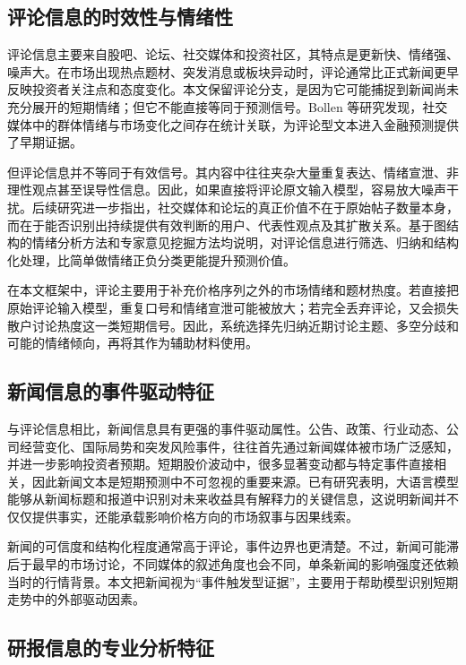 \subsection{评论信息的时效性与情绪性}

评论信息主要来自股吧、论坛、社交媒体和投资社区，其特点是更新快、情绪强、噪声大。在市场出现热点题材、突发消息或板块异动时，评论通常比正式新闻更早反映投资者关注点和态度变化。本文保留评论分支，是因为它可能捕捉到新闻尚未充分展开的短期情绪；但它不能直接等同于预测信号。Bollen 等研究发现，社交媒体中的群体情绪与市场变化之间存在统计关联，为评论型文本进入金融预测提供了早期证据\cite{bollen2011twitter}。

但评论信息并不等同于有效信号。其内容中往往夹杂大量重复表达、情绪宣泄、非理性观点甚至误导性信息。因此，如果直接将评论原文输入模型，容易放大噪声干扰。后续研究进一步指出，社交媒体和论坛的真正价值不在于原始帖子数量本身，而在于能否识别出持续提供有效判断的用户、代表性观点及其扩散关系。基于图结构的情绪分析方法和专家意见挖掘方法均说明，对评论信息进行筛选、归纳和结构化处理，比简单做情绪正负分类更能提升预测价值\cite{zhang2025gnn,zhou2025expertopinion}。

在本文框架中，评论主要用于补充价格序列之外的市场情绪和题材热度。若直接把原始评论输入模型，重复口号和情绪宣泄可能被放大；若完全丢弃评论，又会损失散户讨论热度这一类短期信号。因此，系统选择先归纳近期讨论主题、多空分歧和可能的情绪倾向，再将其作为辅助材料使用。

\subsection{新闻信息的事件驱动特征}

与评论信息相比，新闻信息具有更强的事件驱动属性。公告、政策、行业动态、公司经营变化、国际局势和突发风险事件，往往首先通过新闻媒体被市场广泛感知，并进一步影响投资者预期。短期股价波动中，很多显著变动都与特定事件直接相关，因此新闻文本是短期预测中不可忽视的重要来源。已有研究表明，大语言模型能够从新闻标题和报道中识别对未来收益具有解释力的关键信息，这说明新闻并不仅仅提供事实，还能承载影响价格方向的市场叙事与因果线索\cite{lopezlira2023chatgptstock,elahi2024financialnewsllm}。

新闻的可信度和结构化程度通常高于评论，事件边界也更清楚。不过，新闻可能滞后于最早的市场讨论，不同媒体的叙述角度也会不同，单条新闻的影响强度还依赖当时的行情背景。本文把新闻视为“事件触发型证据”，主要用于帮助模型识别短期走势中的外部驱动因素。

\subsection{研报信息的专业分析特征}


